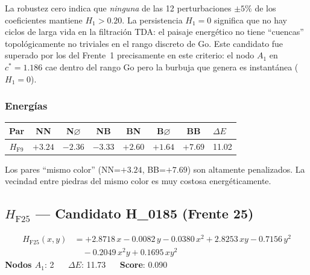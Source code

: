 \documentclass[11pt,a4paper]{article}
\newcommand{\dE}{\Delta E}
\begin{document}
La robustez cero indica que \emph{ninguna} de las 12 perturbaciones
$\pm 5\%$ de los coeficientes mantiene $H_1 > 0.20$.
La persistencia $H_1=0$ significa que no hay ciclos de larga vida
en la filtración TDA: el paisaje energético no tiene ``cuencas''
topológicamente no triviales en el rango discreto de Go.
Este candidato fue superado por los del Frente~1 precisamente en
este criterio: el nodo $A_1$ en $c^*=1.186$ cae dentro del rango Go
pero la burbuja que genera es instantánea ($H_1=0$).

\subsubsection*{Energías}

\begin{center}
\begin{tabular}{ccccccc}
  \toprule
  Par & NN & N$\varnothing$ & NB & BN & B$\varnothing$ & BB & $\dE$ \\
  \midrule
  $H_{\text{F9}}$ & $+3.24$ & $-2.36$ & $-3.33$ & $+2.60$ & $+1.64$ & $+7.69$ & 11.02 \\
  \bottomrule
\end{tabular}
\end{center}

Los pares ``mismo color'' (NN=$+3.24$, BB=$+7.69$) son altamente penalizados.
La vecindad entre piedras del mismo color es muy costosa energéticamente.

\subsection{\texorpdfstring{$H_{\text{F25}}$}{H\_F25} --- Candidato H\_0185 (Frente 25)}

\begin{tcolorbox}[hambox,title={$H_{\text{F25}}$ (H\_0185, \textcolor{cFrontMid}{Frente 25}) $\cdot$
  $H_1$-max = 0.000 $\cdot$ Rob = 0.000}]
\begin{align*}
  H_{\text{F25}}(x,y) &=
    +2.8718\,x - 0.0082\,y
    - 0.0380\,x^2 + 2.8253\,xy - 0.7156\,y^2 \\
  &\quad - 0.2049\,x^2y + 0.1695\,xy^2
\end{align*}
\textbf{Nodos $A_1$}: 2 $\quad$
\textbf{$\dE$}: 11.73 $\quad$
\textbf{Score}: 0.090
\end{tcolorbox}
\end{document}
